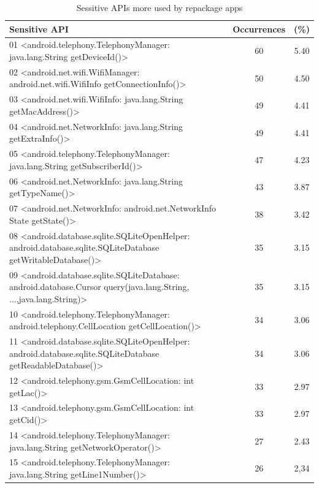 \begin{table}[t]
  \caption{Sessitive APIs more used by repackage apps}
  \centering
  \begin{small}
 \begin{tabular}{lcc}
   \toprule
   Sensitive API & Occurrences & (\%) \\
   \midrule
   01 <android.telephony.TelephonyManager: java.lang.String getDeviceId()> &  60 & 5.40 \\
   02 <android.net.wifi.WifiManager: android.net.wifi.WifiInfo getConnectionInfo()> &  50 & 4.50 \\
   03 <android.net.wifi.WifiInfo: java.lang.String getMacAddress()> &  49 & 4.41 \\
   04 <android.net.NetworkInfo: java.lang.String getExtraInfo()> &  49 & 4.41 \\
   05 <android.telephony.TelephonyManager: java.lang.String getSubscriberId()> &  47 & 4.23 \\
   06 <android.net.NetworkInfo: java.lang.String getTypeName()> &  43 & 3.87 \\
   07 <android.net.NetworkInfo: android.net.NetworkInfo State getState()> &  38 & 3.42 \\
   08 <android.database.sqlite.SQLiteOpenHelper: android.database.sqlite.SQLiteDatabase getWritableDatabase()> &  35 & 3.15 \\
   09 <android.database.sqlite.SQLiteDatabase: android.database.Cursor query(java.lang.String, ...,java.lang.String)> &  35 & 3.15 \\
   10 <android.telephony.TelephonyManager: android.telephony.CellLocation getCellLocation()> &  34 & 3.06 \\
   11 <android.database.sqlite.SQLiteOpenHelper: android.database.sqlite.SQLiteDatabase getReadableDatabase()> &  34 & 3.06 \\
   12 <android.telephony.gsm.GsmCellLocation: int getLac()> &  33 & 2.97 \\
   13 <android.telephony.gsm.GsmCellLocation: int getCid()> &  33 & 2.97 \\
   14 <android.telephony.TelephonyManager: java.lang.String getNetworkOperator()> &  27 & 2.43 \\
   15 <android.telephony.TelephonyManager: java.lang.String getLine1Number()> &  26 & 2,34 \\
   
 \bottomrule

 \end{tabular}
 \end{small}
 \label{tab:APIused}
\end{table}

